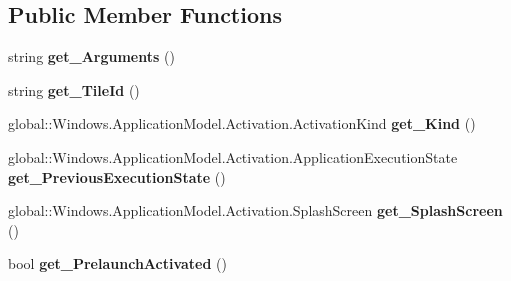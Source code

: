 \subsection*{Public Member Functions}
\begin{DoxyCompactItemize}
\item 
\mbox{\label{class_windows_1_1_application_model_1_1_activation_1_1_launch_activated_event_args_a2f0e833400f9a526d769829a2929be6e}} 
string {\bfseries get\+\_\+\+Arguments} ()
\item 
\mbox{\label{class_windows_1_1_application_model_1_1_activation_1_1_launch_activated_event_args_abfe42f834df00c44cb26f19ea3df1f47}} 
string {\bfseries get\+\_\+\+Tile\+Id} ()
\item 
\mbox{\label{class_windows_1_1_application_model_1_1_activation_1_1_launch_activated_event_args_a8a1941039506449bd08dae63fe6deaaa}} 
global\+::\+Windows.\+Application\+Model.\+Activation.\+Activation\+Kind {\bfseries get\+\_\+\+Kind} ()
\item 
\mbox{\label{class_windows_1_1_application_model_1_1_activation_1_1_launch_activated_event_args_acf63cfda1c3de4f08983a4af7c24697b}} 
global\+::\+Windows.\+Application\+Model.\+Activation.\+Application\+Execution\+State {\bfseries get\+\_\+\+Previous\+Execution\+State} ()
\item 
\mbox{\label{class_windows_1_1_application_model_1_1_activation_1_1_launch_activated_event_args_a971bc89f3d06dc11ddb57e25333dcb8a}} 
global\+::\+Windows.\+Application\+Model.\+Activation.\+Splash\+Screen {\bfseries get\+\_\+\+Splash\+Screen} ()
\item 
\mbox{\label{class_windows_1_1_application_model_1_1_activation_1_1_launch_activated_event_args_a0e1e0d199b725ce3e4aeb5f0c33874c2}} 
bool {\bfseries get\+\_\+\+Prelaunch\+Activated} ()

\end{DoxyCompactItemize}
